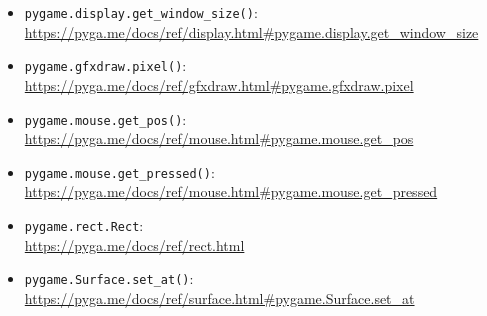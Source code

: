 \begin{itemize}
	\item \texttt{pygame.display.get\_window\_size()}:
	\\
	\url{https://pyga.me/docs/ref/display.html#pygame.display.get_window_size}

	\item \texttt{pygame.gfxdraw.pixel()}:
    \\ \url{https://pyga.me/docs/ref/gfxdraw.html#pygame.gfxdraw.pixel}

	\item \texttt{pygame.mouse.get\_pos()}:
	\\
	\url{https://pyga.me/docs/ref/mouse.html#pygame.mouse.get_pos}

	\item \texttt{pygame.mouse.get\_pressed()}:
	\\
	\url{https://pyga.me/docs/ref/mouse.html#pygame.mouse.get_pressed}

	\item \texttt{pygame.rect.Rect}:
    \\
    \url{https://pyga.me/docs/ref/rect.html}
	
	\item \texttt{pygame.Surface.set\_at()}:
	\\
	\url{https://pyga.me/docs/ref/surface.html#pygame.Surface.set_at}
	
\end{itemize}

